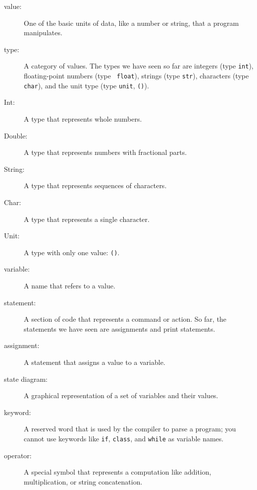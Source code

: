 \documentclass[10pt]{book}
\begin{document}
\begin{description}

\item[value:]  One of the basic units of data, like a number or string, 
that a program manipulates.

\item[type:] A category of values.  The types we have seen so far
are integers (type {\tt int}), floating-point numbers (type {\tt
float}), strings (type {\tt str}), characters (type {\tt char}), and 
the unit type (type {\tt unit}, {\tt ()}).

\item[Int:] A type that represents whole numbers.

\item[Double:] A type that represents numbers with fractional
parts.

\item[String:] A type that represents sequences of characters.

\item[Char:] A type that represents a single character.

\item[Unit:] A type with only one value: {\tt ()}.

\item[variable:] A name that refers to a value.

\item[statement:] A section of code that represents a command or action.  So
far, the statements we have seen are assignments and print statements.

\item[assignment:] A statement that assigns a value to a variable.

\item[state diagram:] A graphical representation of a set of variables and their values.

\item[keyword:] A reserved word that is used by the compiler to parse a
program; you cannot use keywords like {\tt if}, {\tt  class}, and {\tt while} as
variable names.

\item[operator:] A special symbol that represents a computation like
addition, multiplication, or string concatenation.


\end{description}
\end{document}
